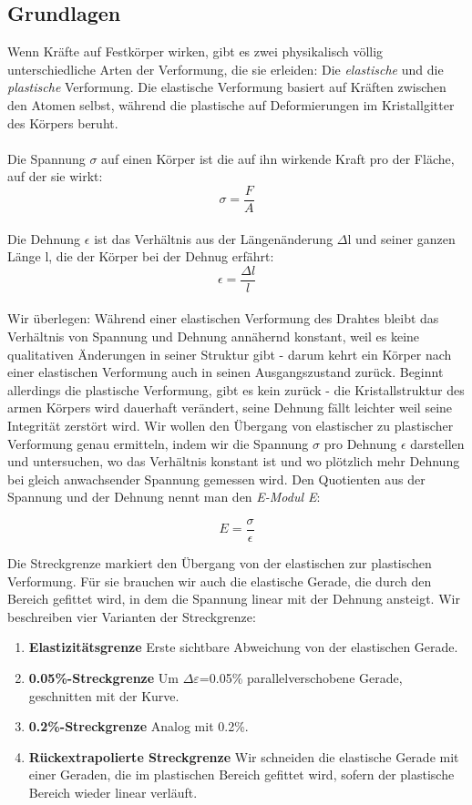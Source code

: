 \documentclass{article}
\begin{document}
\subsection{Grundlagen}
Wenn Kräfte auf Festkörper wirken, gibt es zwei physikalisch völlig unterschiedliche Arten der Verformung, die sie erleiden: Die \textit{elastische} und die \textit{plastische} Verformung. Die elastische Verformung basiert auf Kräften zwischen den Atomen selbst, während die plastische auf Deformierungen im Kristallgitter des Körpers beruht. \\
\\Die Spannung $\sigma$ auf einen Körper ist die auf ihn wirkende Kraft pro der Fläche, auf der sie wirkt:  $$ \sigma = \frac{F}{A} $$ \\
Die Dehnung  $\epsilon$ ist das Verhältnis aus der Längenänderung $\Delta$l und seiner ganzen Länge l, die der Körper bei der Dehnug erfährt: \\
$$ \epsilon= \frac{\Delta l}{l} $$ \\
 Wir überlegen: Während einer elastischen Verformung des Drahtes bleibt das Verhältnis von Spannung und Dehnung annähernd konstant, weil es keine qualitativen Änderungen in seiner Struktur gibt - darum kehrt ein Körper nach einer elastischen Verformung auch in seinen Ausgangszustand zurück. Beginnt allerdings die plastische Verformung, gibt es kein zurück - die Kristallstruktur des armen Körpers wird dauerhaft verändert, seine Dehnung fällt leichter weil seine Integrität zerstört wird. Wir wollen den Übergang von elastischer zu plastischer Verformung genau ermitteln, indem wir die Spannung $\sigma$ pro Dehnung $\epsilon$ darstellen und untersuchen, wo das Verhältnis konstant ist und wo plötzlich mehr Dehnung bei gleich anwachsender Spannung gemessen wird. Den Quotienten aus der Spannung und der Dehnung nennt man den \textit{E-Modul E}:

$$ E=\frac{\sigma}{\epsilon}$$

Die Streckgrenze markiert den Übergang von der elastischen zur plastischen Verformung. Für sie brauchen wir auch die elastische Gerade, die durch den Bereich gefittet wird, in dem die Spannung linear mit der Dehnung ansteigt. Wir beschreiben vier Varianten der Streckgrenze:
\begin{enumerate}
\item \textbf{Elastizitätsgrenze} Erste sichtbare Abweichung von der elastischen Gerade.
\item \textbf{0.05\%-Streckgrenze} Um $\Delta \varepsilon$=0.05\% parallelverschobene Gerade, geschnitten mit der Kurve.
\item \textbf{0.2\%-Streckgrenze} Analog mit 0.2\%.
\item \textbf{Rückextrapolierte Streckgrenze} Wir schneiden die elastische Gerade mit einer Geraden, die im plastischen Bereich gefittet wird, sofern der plastische Bereich wieder linear verläuft.
\end{enumerate}
\end{document}
